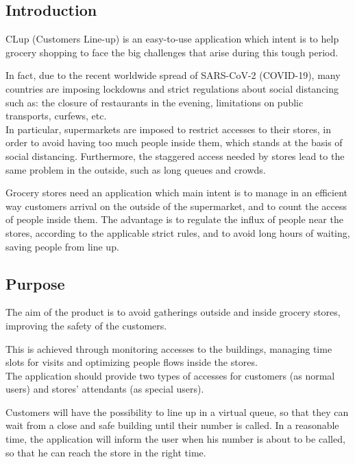 \documentclass[table, 12pt]{article}
\begin{document}
\begin{flushleft}
    \section{Introduction}
    CLup (Customers Line-up) is an easy-to-use application which intent is to help grocery shopping to face the big challenges that arise during this tough period.

    In fact, due to the recent worldwide spread of SARS-CoV-2 (COVID-19), many countries are imposing lockdowns and strict regulations about social distancing such as: the closure of restaurants in the evening, limitations on public transports, curfews, etc.\\


    In particular, supermarkets are imposed to restrict accesses to their stores, in order to avoid having too much people inside them, which stands at the basis of social distancing. Furthermore, the staggered access needed by stores lead to the same problem in the outside, such as long queues and crowds.

    Grocery stores need an application which main intent is to manage in an efficient way customers arrival on the outside of the supermarket, and to count the access of people inside them. The advantage is to regulate the influx of people near the stores, according to the applicable strict rules, and to avoid long hours of waiting, saving people from line up.

    \subsection{Purpose}
    The aim of the product is to avoid gatherings outside and inside grocery stores,  improving the safety of the customers.

    This is achieved through monitoring accesses to the buildings, managing time slots for visits and optimizing people flows inside the stores.\\

    The application should provide two types of accesses for customers (as normal users) and stores' attendants (as special users).

    Customers will have the possibility to line up in a virtual queue, so that they can wait from a close and safe building until their number is called. In a reasonable time, the application will inform the user when his number is about to be called, so that he can reach the store in the right time.\\


\end{flushleft}
\end{document}
